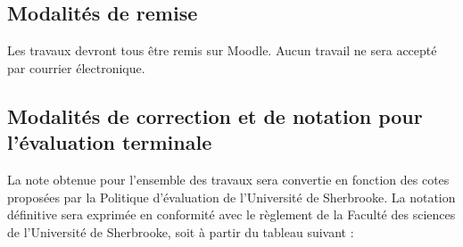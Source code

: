 \documentclass[12]{article}
\begin{document}
	\subsection*{Modalités de remise}

	Les travaux devront tous être remis sur Moodle. Aucun travail ne sera
	accepté par courrier électronique.

	\subsection*{Modalités de correction et de notation pour l'évaluation terminale}

	La note obtenue pour l’ensemble des travaux sera convertie en fonction des
	cotes proposées par la Politique d’évaluation de l’Université de Sherbrooke.
	La notation définitive sera exprimée en conformité avec le règlement de la
	Faculté des sciences de l’Université de Sherbrooke, soit à partir du tableau
	suivant :
	
\end{document}
